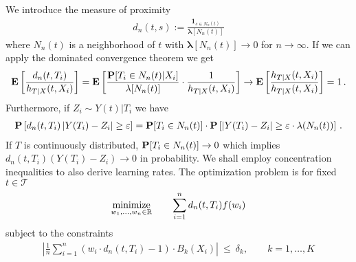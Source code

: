 We introduce the measure of proximity
\begin{gather}
  d_n(t,s)
  :=
  \frac{
  \mathbf{1} _ 
  { s \in N_n(t) }
}{
  \mathbf{\lambda}[N_n(t)]
}
\end{gather}
where $ N_n(t) $ is a neighborhood of $t$ with 
$  
  \mathbf{\lambda}[N_n(t)]
  \to
  0
  $
  for $ n \to \infty $.
  If we can apply the dominated convergence theorem we get
  \begin{align}
    \E
    \left[ 
      \frac{
        d_n(t,T_i)
      }{
        h_{T|X}(t,X_i)
      }
    \right]
    =
    \E
    \left[ 
      \frac{
        \P
        [ T_i \in N_n(t) | X_i]
      }
      {
        \mathbf{\lambda}[N_n(t)]
      }
      \cdot
      \frac{1}
      {
        h_{T|X}(t,X_i)
      }
    \right]
    \to
    \E
    \left[ 
      \frac
      {
        h_{T|X}(t,X_i)
      }
      {
        h_{T|X}(t,X_i)
      }
    \right]
    =1
    \,.
  \end{align}
  Furthermore, if $ Z_i \sim Y(t)|T_i $
  we have
  \begin{gather}
    \P
    \left[ 
      d_n(t,T_i)
      \left| 
      Y(T_i) - Z_i
      \right|
      \ge
      \varepsilon
    \right]
    =
    \P
    [
      T_i \in N_n(t)
    ]
    \cdot
    \P
    \left[ 
      \left| 
      Y(T_i) - Z_i
      \right|
      \ge
      \varepsilon
      \cdot
      \lambda(N_n(t))
    \right]
    \,.
  \end{gather}
  If $T$ is continuously distributed, 
  $
    \P
    [
      T_i \in N_n(t)
    ]
    \to 0
  $
  which implies 
  $
      d_n(t,T_i)
      \left( 
      Y(T_i) - Z_i
      \right)
      \to
      0
  $
  in probability. We shall employ concentration inequalities to 
  also derive learning rates.
  The optimization problem is for fixed
  $ t\in \mathcal{T} $
  \begin{gather*}
    \underset{w_1, \ldots, w_n \in \R}{\mathrm{minimize}}
    \qquad
    \sum_{i = 1}^{n}
    d_n(t,T_i)
    f(w_i)
  \end{gather*}
subject to the constraints
\begin{gather*}
    \left| 
      \frac{1}{n} 
      \sum_{i = 1}^{n} 
      (
      w_i  
      \cdot
    d_n(t,T_i)
      - 
      1
      )
      \cdot
      B_k(X_i)
    \right|
    \ 
    \le 
    \ 
    \delta_k,
    \qquad
    k = 1, \ldots, K
\end{gather*}
